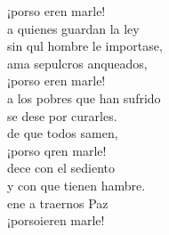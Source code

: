\documentclass[12pt]{article}
\begin{document}
\begin{multicols*}{2}
\begin{cancion}
	¡porso eren marle!\\
\jump
	a quienes guardan la ley\\
	sin qul hombre le importase,\\
	ama sepulcros anqueados,\\
	¡porso eren marle!\\
\jump
	a los pobres que han sufrido\\
	se dese por curarles.\\
	de que todos samen,\\
	¡porso qren marle!\\
\jump
	dece con el sediento\\
	y con  que tienen hambre.\\
	ene a traernos  Paz\\
	¡porsoieren marle!\\
\end{cancion}%


\end{multicols*}
\end{document}
